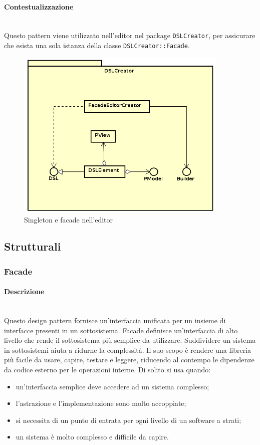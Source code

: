 \paragraph{Contestualizzazione}\mbox{} \\
Questo pattern viene utilizzato nell'editor nel package \texttt{DSLCreator}, per assicurare che esista una sola istanza della classe \texttt{DSLCreator::Facade}.
\begin{figure}[H]
\centering
\includegraphics[width=0.9\textwidth]{res/sections/frontend/facade_editor.png}
\caption{Singleton e facade nell'editor}
\label{fig:singleton_editor}
\end{figure}
\subsection{Strutturali}
\subsubsection{Facade}
\paragraph{Descrizione} \mbox{} \\
Questo design pattern fornisce un'interfaccia unificata per un insieme di interfacce presenti in un sottosistema. Facade definisce un'interfaccia di alto livello che rende il sottosistema più semplice da utilizzare. Suddividere un sistema in sottosistemi aiuta a ridurne la complessità. Il suo scopo è rendere una libreria più facile da usare, capire, testare e leggere, riducendo al contempo le dipendenze da codice esterno per le operazioni interne. Di solito si usa quando:
\begin{itemize}
\item un'interfaccia semplice deve accedere ad un sistema complesso;
\item l'astrazione e l'implementazione sono molto accoppiate;
\item si necessita di un punto di entrata per ogni livello di un software a strati;
\item un sistema è molto complesso e difficile da capire.
\end{itemize}
